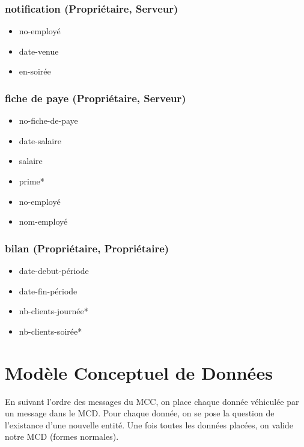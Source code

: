 \subsubsection*{notification (Propriétaire, Serveur)}
\begin{itemize}
    \item no-employé
    \item date-venue
    \item en-soirée
\end{itemize}

\subsubsection*{fiche de paye (Propriétaire, Serveur)}
\begin{itemize}
    \item no-fiche-de-paye
    \item date-salaire
    \item salaire
    \item prime*
    \item no-employé
    \item nom-employé
\end{itemize}

\subsubsection*{bilan (Propriétaire, Propriétaire)}
\begin{itemize}
    \item date-debut-période
    \item date-fin-période
    \item nb-clients-journée*
    \item nb-clients-soirée*
\end{itemize}

\newpage
\section*{Modèle Conceptuel de Données}

En suivant l'ordre des messages du MCC, on place chaque donnée véhiculée par un message dans le MCD. Pour chaque donnée, on se pose la question de l'existance d'une nouvelle entité. Une fois toutes les données placées, on valide notre MCD (formes normales).


